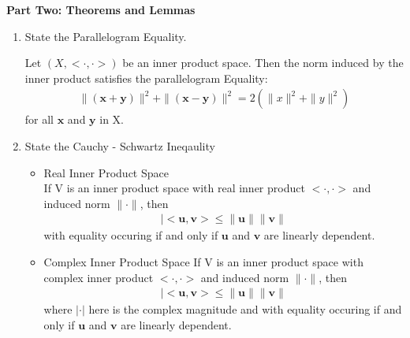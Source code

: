 \documentclass[11pt]{SelfArxOneColBMN}
\begin{document}
\textbf{Part Two: Theorems and Lemmas}
\begin{enumerate}
  \item State the Parallelogram Equality.
  \begin{solution}
    Let $(X,<\cdot,\cdot>)$ be an inner product space. Then the norm induced by the inner product satisfies the parallelogram Equality:
    \begin{eqnarray*}
      \|(\mathbf{x} + \mathbf{y})\|^2 + \|(\mathbf{x} - \mathbf{y})\|^2 = 2(\|x\|^2 + \|y\|^2)
    \end{eqnarray*}
    for all $\mathbf{x}$ and $\mathbf{y}$ in X.
  \end{solution}
  \item State the Cauchy - Schwartz Ineqaulity
  \begin{solution}
    \begin{itemize}
      \item Real Inner Product Space\\
      If V is an inner product space with real inner product $<\cdot,\cdot>$ and induced norm $\|\cdot\|$, then
      \begin{eqnarray*}
        |<\mathbf{u},\mathbf{v}> \leq \|\mathbf{u}\|\|\mathbf{v}\|
      \end{eqnarray*}
      with equality occuring if and only if $\mathbf{u}$ and $\mathbf{v}$ are linearly dependent.
      \item Complex Inner Product Space
      If V is an inner product space with complex inner product $<\cdot,\cdot>$ and induced norm $\|\cdot\|$, then
      \begin{eqnarray*}
        |<\mathbf{u},\mathbf{v}> \leq \|\mathbf{u}\|\|\mathbf{v}\|
      \end{eqnarray*}
      where $|\cdot|$ here is the complex magnitude and with equality occuring if and only if $\mathbf{u}$ and $\mathbf{v}$ are linearly dependent.
    \end{itemize}
  \end{solution}
\end{enumerate}
\end{document}
